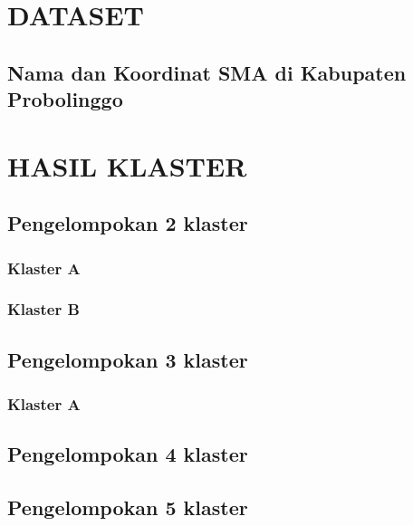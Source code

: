 \newpage
\thispagestyle{empty}
\appendix
\renewcommand{\thechapter}{\arabic{chapter}}
\renewcommand{\thesection}{\thechapter.\arabic{section}}
\renewcommand{\thesubsection}{\thechapter.\arabic{section}.\arabic{subsection}}

\chapter{DATASET}
\label{lampiran1}
\section{Nama dan Koordinat SMA di Kabupaten Probolinggo}



\chapter{HASIL KLASTER}
\label{lampiran2}

\section{Pengelompokan 2 klaster}

\subsection{Klaster A}


\subsection{Klaster B}


\section{Pengelompokan 3 klaster}

\subsection{Klaster A}


\section{Pengelompokan 4 klaster}
\section{Pengelompokan 5 klaster}
